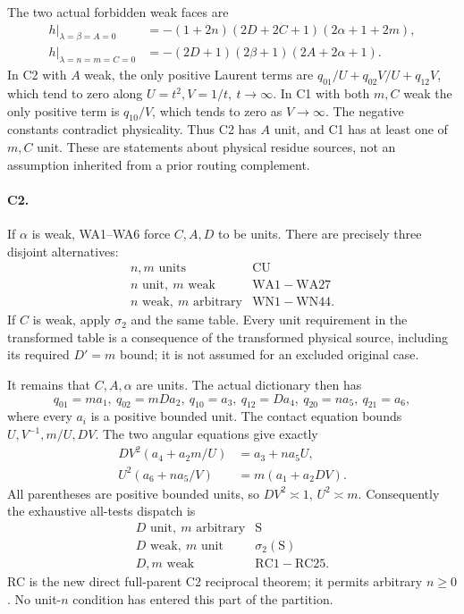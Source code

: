 The two actual forbidden weak faces are
\[
\begin{aligned}
 h|_{\lambda=\beta=A=0}
 &=-(1+2n)(2D+2C+1)(2\alpha+1+2m),\\
 h|_{\lambda=n=m=C=0}
 &=-(2D+1)(2\beta+1)(2A+2\alpha+1).
\end{aligned}\tag{AU14}
\]
In C2 with \(A\) weak, the only positive Laurent terms are
\(q_{01}/U+q_{02}V/U+q_{12}V\), which tend to zero along
\(U=t^2,V=1/t,\ t\to\infty\).
In C1 with both \(m,C\) weak the only positive term is \(q_{10}/V\),
which tends to zero as \(V\to\infty\).
The negative constants contradict physicality.
Thus C2 has \(A\) unit, and C1 has at least one of \(m,C\) unit.
These are statements about physical residue sources, not an
assumption inherited from a prior routing complement.

\paragraph{C2.}
If \(\alpha\) is weak, WA1--WA6 force \(C,A,D\) to be units.
There are precisely three disjoint alternatives:
\[
\begin{array}{c|c}
 n,m\text{ units}&\mathrm{CU}\\
 n\text{ unit},\ m\text{ weak}&\mathrm{WA1\!-\!WA27}\\
 n\text{ weak},\ m\text{ arbitrary}&\mathrm{WN1\!-\!WN44}.
\end{array}\tag{AU15}
\]
If \(C\) is weak, apply \(\sigma_2\) and the same table.
Every unit requirement in the transformed table is a consequence
of the transformed physical source, including its required
\(D'=m\) bound; it is not assumed for an excluded original case.

It remains that \(C,A,\alpha\) are units.
The actual dictionary then has
\[
 q_{01}=ma_1,\ q_{02}=mDa_2,\ q_{10}=a_3,\
 q_{12}=Da_4,\ q_{20}=na_5,\ q_{21}=a_6 ,
\]
where every \(a_i\) is a positive bounded unit.
The contact equation bounds \(U,V^{-1},m/U,DV\).
The two angular equations give exactly
\[
 \begin{split}
 DV^2(a_4+a_2m/U)&=a_3+na_5U,\\
 U^2(a_6+na_5/V)&=m(a_1+a_2DV).
 \end{split}
\]
All parentheses are positive bounded units, so
\(DV^2\asymp1\), \(U^2\asymp m\).
Consequently the exhaustive all-tests dispatch is
\[
\begin{array}{c|c}
 D\text{ unit},\ m\text{ arbitrary}&\mathrm S\\
 D\text{ weak},\ m\text{ unit}&\sigma_2(\mathrm S)\\
 D,m\text{ weak}&\mathrm{RC1\!-\!RC25}.
\end{array}\tag{AU16}
\]
RC is the new direct full-parent C2 reciprocal theorem; it permits
arbitrary \(n\geq0\). No unit-\(n\) condition has entered this
part of the partition.

